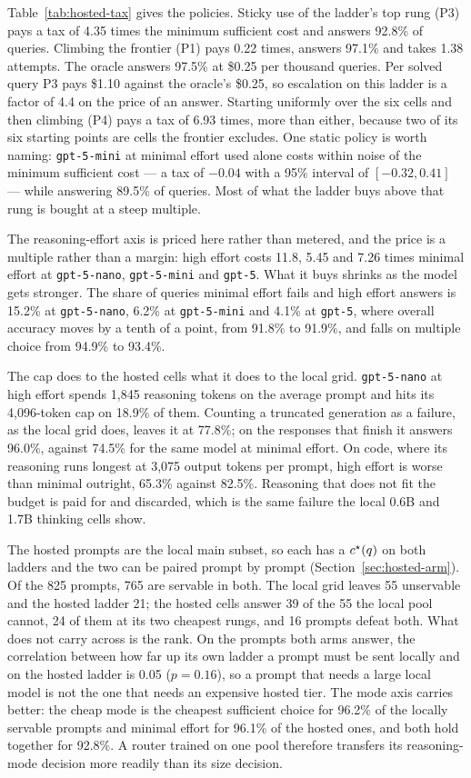 Table~\ref{tab:hosted-tax} gives the policies. Sticky use of the ladder's
top rung (P3) pays a tax of 4.35 times the minimum sufficient cost and
answers 92.8\% of queries. Climbing the frontier (P1) pays 0.22 times,
answers 97.1\% and takes 1.38 attempts. The oracle answers 97.5\% at \$0.25 per
thousand queries. Per solved query P3 pays \$1.10 against the oracle's
\$0.25, so escalation on this ladder is a factor of 4.4 on the price of an
answer. Starting uniformly over the six cells and then climbing (P4) pays
a tax of 6.93 times, more than either, because two of its six starting points are
cells the frontier excludes. One static policy is worth naming:
\texttt{gpt-5-mini} at minimal effort used alone costs within noise of the
minimum sufficient cost --- a tax of $-0.04$ with a 95\% interval of
$[-0.32, 0.41]$ --- while answering 89.5\% of queries. Most of what the
ladder buys above that rung is bought at a steep multiple.

The reasoning-effort axis is priced here rather than metered, and the
price is a multiple rather than a margin: high effort costs 11.8, 5.45 and
7.26 times minimal effort at \texttt{gpt-5-nano}, \texttt{gpt-5-mini} and
\texttt{gpt-5}. What it buys shrinks as the model gets stronger. The share
of queries minimal effort fails and high effort answers is 15.2\% at
\texttt{gpt-5-nano}, 6.2\% at \texttt{gpt-5-mini} and 4.1\% at
\texttt{gpt-5}, where overall accuracy moves by a tenth of a point, from
91.8\% to 91.9\%, and falls on multiple choice from 94.9\% to 93.4\%.

The cap does to the hosted cells what it does to the local grid.
\texttt{gpt-5-nano} at high effort spends 1{,}845 reasoning tokens on the
average prompt and hits its 4{,}096-token cap on 18.9\% of them. Counting
a truncated generation as a failure, as the local grid does, leaves it at
77.8\%; on the responses that finish it answers 96.0\%, against 74.5\% for
the same model at minimal effort. On code, where its reasoning runs
longest at 3{,}075 output tokens per prompt, high effort is worse than
minimal outright, 65.3\% against 82.5\%. Reasoning that does not fit the
budget is paid for and discarded, which is the same failure the local 0.6B
and 1.7B thinking cells show.

The hosted prompts are the local main subset, so each has a $c^{\star}(q)$ on
both ladders and the two can be paired prompt by prompt
(Section~\ref{sec:hosted-arm}). Of the 825 prompts, 765 are servable in
both. The local grid leaves 55 unservable and the hosted ladder 21; the
hosted cells answer 39 of the 55 the local pool cannot, 24 of them at its two
cheapest rungs, and 16 prompts defeat both. What does not carry across is the
rank. On the prompts both arms answer, the correlation between how far up its
own ladder a prompt must be sent locally and on the hosted ladder is 0.05
($p = 0.16$), so a prompt that needs a large local model is not the one that
needs an expensive hosted tier. The mode axis carries better: the cheap mode
is the cheapest sufficient choice for 96.2\% of the locally servable prompts
and minimal effort for 96.1\% of the hosted ones, and both hold together for
92.8\%. A router trained on one pool therefore transfers its reasoning-mode
decision more readily than its size decision.

